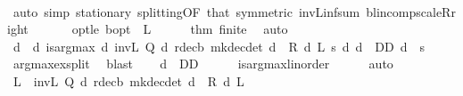\begin{isabellebody}
\ \ \ \ \ \ \isamarkupfalse%
\ {\isacharparenleft}{\kern0pt}auto\ simp{\isacharcolon}{\kern0pt}\ {\isasymnu}{\isacharunderscore}{\kern0pt}stationary\ splitting{\isacharbrackleft}{\kern0pt}OF\ that{\isacharcomma}{\kern0pt}\ symmetric{\isacharbrackright}{\kern0pt}\ inv\isactrlsub L{\isacharunderscore}{\kern0pt}inf{\isacharunderscore}{\kern0pt}sum\ blincomp{\isacharunderscore}{\kern0pt}scaleR{\isacharunderscore}{\kern0pt}right{\isacharparenright}{\kern0pt}\isanewline
\ \ \isamarkupfalse%
\isanewline
\ \ \isamarkupfalse%
\ opt{\isacharunderscore}{\kern0pt}le{\isacharcolon}{\kern0pt}\ {\isachardoublequoteopen}{\isasymnu}\isactrlsub b{\isacharunderscore}{\kern0pt}opt\ {\isasymle}\ L{\isachardoublequoteclose}\isanewline
\ \ \ \ \isamarkupfalse%
\ thm{\isacharunderscore}{\kern0pt}{}{\isacharunderscore}{\kern0pt}{}{\isacharunderscore}{\kern0pt}{}{}\ finite\ \isamarkupfalse%
\ auto\isanewline
\isanewline
\ \ \isamarkupfalse%
\ d\ \ d{\isacharcolon}{\kern0pt}\ {\isachardoublequoteopen}is{\isacharunderscore}{\kern0pt}arg{\isacharunderscore}{\kern0pt}max\ {\isacharparenleft}{\kern0pt}{\isasymlambda}d{\isachardot}{\kern0pt}\ inv\isactrlsub L\ {\isacharparenleft}{\kern0pt}Q\ d{\isacharparenright}{\kern0pt}\ {\isacharparenleft}{\kern0pt}r{\isacharunderscore}{\kern0pt}dec\isactrlsub b\ {\isacharparenleft}{\kern0pt}mk{\isacharunderscore}{\kern0pt}dec{\isacharunderscore}{\kern0pt}det\ d{\isacharparenright}{\kern0pt}\ {\isacharplus}{\kern0pt}\ R\ d\ L{\isacharparenright}{\kern0pt}\ s{\isacharparenright}{\kern0pt}\ {\isacharparenleft}{\kern0pt}{\isasymlambda}d{\isachardot}{\kern0pt}\ d\ {\isasymin}\ D\isactrlsub D{\isacharparenright}{\kern0pt}\ d{\isachardoublequoteclose}\ \ s\isanewline
\ \ \ \ \isamarkupfalse%
\ arg{\isacharunderscore}{\kern0pt}max{\isacharunderscore}{\kern0pt}ex{\isacharunderscore}{\kern0pt}split\ \isamarkupfalse%
\ blast\isanewline
\ \ \isamarkupfalse%
\ {\isachardoublequoteopen}d\ {\isasymin}\ D\isactrlsub D{\isachardoublequoteclose}\isanewline
\ \ \ \ \isamarkupfalse%
\ is{\isacharunderscore}{\kern0pt}arg{\isacharunderscore}{\kern0pt}max{\isacharunderscore}{\kern0pt}linorder\isanewline
\ \ \ \ \isamarkupfalse%
\ auto\isanewline
\ \ \isamarkupfalse%
\ {\isachardoublequoteopen}L\ {\isacharequal}{\kern0pt}\ inv\isactrlsub L\ {\isacharparenleft}{\kern0pt}Q\ d{\isacharparenright}{\kern0pt}\ {\isacharparenleft}{\kern0pt}r{\isacharunderscore}{\kern0pt}dec\isactrlsub b\ {\isacharparenleft}{\kern0pt}mk{\isacharunderscore}{\kern0pt}dec{\isacharunderscore}{\kern0pt}det\ d{\isacharparenright}{\kern0pt}\ {\isacharplus}{\kern0pt}\ R\ d\ L{\isacharparenright}{\kern0pt}{\isachardoublequoteclose}\isanewline

\end{isabellebody}
